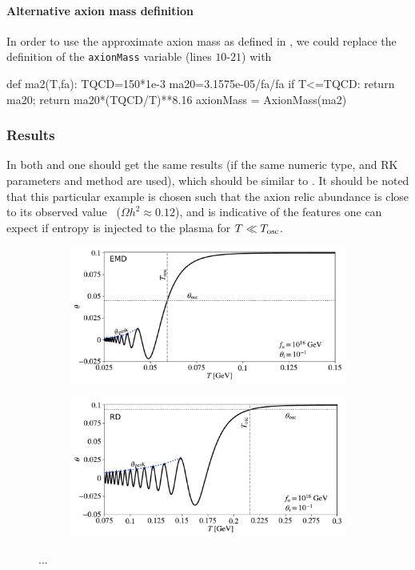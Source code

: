 \documentclass[11pt,a4paper]{article}
\begin{document}
\paragraph{Alternative axion mass definition}
%
In order to use the approximate axion mass as defined in , we could replace the definition of the {\tt axionMass} variable (lines $10$-$21$) with
%
\begin{py}
	def ma2(T,fa):
		TQCD=150*1e-3
		ma20=3.1575e-05/fa/fa
		if T<=TQCD:
			return ma20;
		return ma20*(TQCD/T)**8.16
	axionMass = AxionMass(ma2)
\end{py}

\subsubsection{Results}
%
In both \CPP and \PY one should get the same results (if the same numeric type, and RK parameters and method are used), which should be similar to . 
%
It should be noted that this particular example is chosen such that the axion relic abundance is close to its observed value~\cite{Planck:2018vyg} ($\Omega h^2 \approx 0.12$), and is indicative of the features one can expect if entropy is injected to the plasma for $T \ll T_{\rm osc}{}$.
%
\begin{figure}[h]
	\begin{subfigure}[]{0.5\textwidth}
		\includegraphics[width=1\textwidth]{figs/theta_evolution-EMD.pdf}
		\caption{}
		\label{fig:theta_evolution-EMD}
	\end{subfigure}
	\begin{subfigure}[]{0.5\textwidth}
		\includegraphics[width=1\textwidth]{figs/theta_evolution-RD.pdf}
		\caption{}
		\label{fig:theta_evolution-RD}
	\end{subfigure}
	\caption{...}
	\label{fig:results}
\end{figure}
\end{document}
